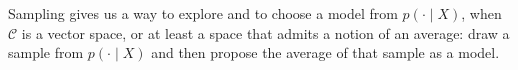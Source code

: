 Sampling gives
us a way to explore and to choose a model from $p(\cdot \mid X)$, when $\mathcal{C}$ is a vector
space, or at least a space that admits a notion of an average: draw a sample from $p(\cdot \mid X)$ and then propose the average of that sample as a model.
%
%
%
%
%

